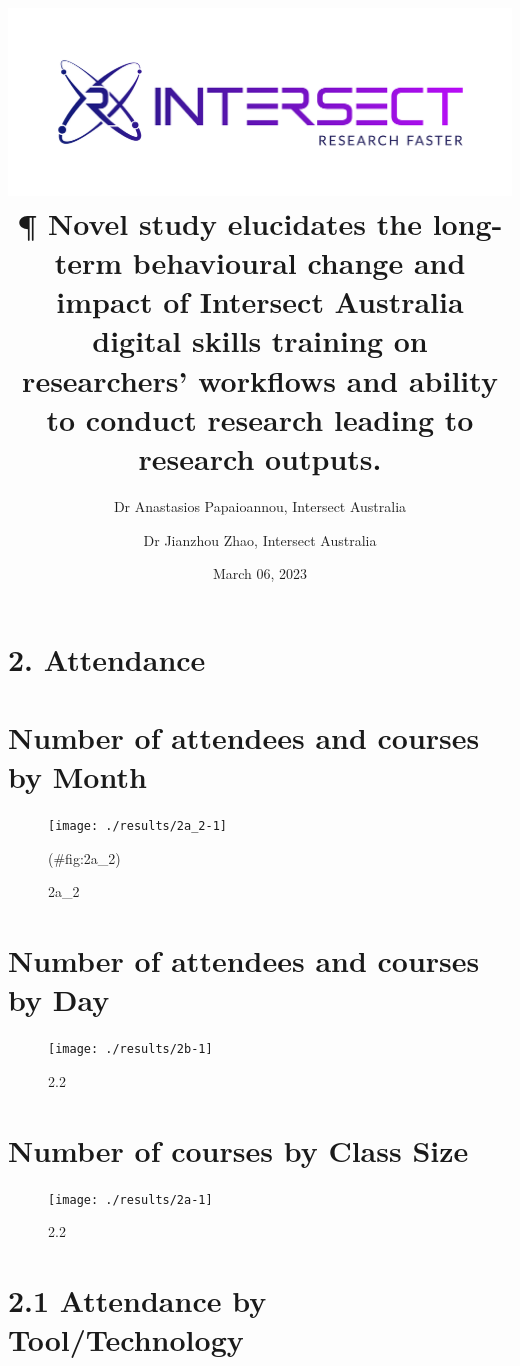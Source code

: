 \documentclass[
]{article}
\title{\includegraphics[width=6in,height=\textheight]{./atomic.h.taglogo.rgb@3x.png} \vspace{0.2in} ¶ Novel study elucidates the long-term behavioural change and impact of Intersect Australia digital skills training on researchers' workflows and ability to conduct research leading to research outputs.
\vspace{0.1in}}
\author{Dr Anastasios Papaioannou, Intersect Australia \and Dr Jianzhou Zhao, Intersect Australia}
\date{\vspace{0.5in} March 06, 2023}
\begin{document}
\maketitle

\hypertarget{attendance}{%
\section{2. Attendance}\label{attendance}}

\hypertarget{number-of-attendees-and-courses-by-month}{%
\section{Number of attendees and courses by Month}\label{number-of-attendees-and-courses-by-month}}

\begin{figure}[H]

{\centering \texttt{[image: ./results/2a\_2-1]} 

}

\caption{2a_2}(\#fig:2a_2)
\end{figure}

\hypertarget{number-of-attendees-and-courses-by-day}{%
\section{Number of attendees and courses by Day}\label{number-of-attendees-and-courses-by-day}}

\begin{figure}[H]

{\centering \texttt{[image: ./results/2b-1]} 

}

\caption{2.2}\label{fig:2b}
\end{figure}

\hypertarget{number-of-courses-by-class-size}{%
\section{Number of courses by Class Size}\label{number-of-courses-by-class-size}}

\begin{figure}[H]

{\centering \texttt{[image: ./results/2a-1]} 

}

\caption{2.2}\label{fig:2a}
\end{figure}

\hypertarget{attendance-by-tooltechnology}{%
\section{2.1 Attendance by Tool/Technology}\label{attendance-by-tooltechnology}}
\end{document}
